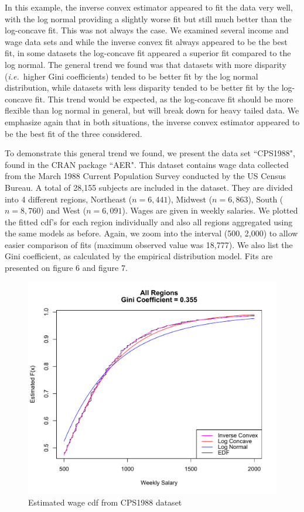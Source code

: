 \documentclass[11pt]{article}
\numberwithin{equation}{section}
\begin{document}
	In this example, the inverse convex estimator appeared to fit the data very well, with the log normal providing a slightly worse fit but still much better than the log-concave fit. This was not always the case. We examined several income and wage data sets and while the inverse convex fit always appeared to be the best fit, in some datasets the log-concave fit appeared a superior fit compared to the log normal. The general trend we found was that datasets with more disparity (\emph{i.e.}\ higher Gini coefficients) tended to be better fit by the log normal distribution, while datasets with less disparity tended to be better fit by the log-concave fit. This trend would be expected, as the log-concave fit should be more flexible than log normal in general, but will break down for heavy tailed data. We emphasize again that in both situations, the inverse convex estimator appeared to be the best fit of the three considered. 
	
	 To demonstrate this general trend we found, we present the data set ``CPS1988", found in the CRAN package ``AER". This dataset contains wage data collected from the March 1988 Current Population Survey conducted by the US Census Bureau. A total of 28,155 subjects are included in the dataset. They are divided into 4 different regions, Northeast ($n = 6,441$), Midwest ($n = 6,863$), South ($n = 8,760$) and West ($n = 6,091$). Wages are given in weekly salaries. We plotted the fitted cdf's for each region individually and also all regions aggregated using the same models as before. Again, we zoom into the interval (500, 2,000) to allow easier comparison of fits (maximum observed value was 18,777). We also list the Gini coefficient, as calculated by the empirical distribution model. Fits are presented on figure 6 and figure 7. 

	\begin{figure}[H]
	\centerline{\includegraphics[width = 14cm]{CombineRegions.pdf} }
	\caption{Estimated wage cdf from CPS1988 dataset}
	\end{figure} 	
	
\end{document}
